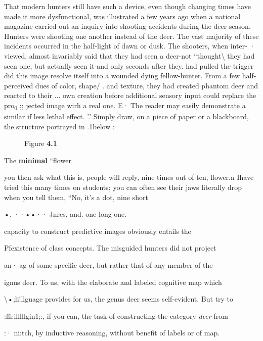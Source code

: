 That modern hunters still have such a device, even though changing times have made it more dysfunctional, was illustrated a few years ago when a national magazine carried out an inquiry into shooting accidents during the deer season. Hunters were shooting one another instead of the deer. The vast majority of these incidents oc\-curred in the half-light of dawn or dusk. The shooters, when inter- · viewed, almost invariably said that they had seen a deer-not ``thought{\textquotedbl}{\textbackslash} they had seen one, but actually seen it-and only seconds after they. had pulled the trigger did this image resolve itself into a wounded
dying fellow-hunter. From a few half-perceived dues of color, shape/ . and texture, they had created phantom deer and reacted to their ...
own creation before additional sensory input could replace the pro\textsubscript{0}\textsubscript{ };;
jected image wirh a real one. E·
The reader may easily demonstrate a similar if less lethal effect. '.'
Simply draw, on a piece of paper or a blackboard, the structure por\-trayed in .1below :

  


 
\begin{figure}
Figure \textbf{4.1}
\end{figure}

The \textbf{minimal} ``flower{\textquotedbl}


you then ask what this is, people will reply, nine times out of ten, flower.n Ihave tried this many times on students; you can often see their jaws literally drop when you tell them, ``No, it's a dot, nine short

•. ··••·· Jnres, and. one long one.{\textquotedbl}

capacity to construct predictive images obviously entails the

Pfexistence of class concepts. The misguided hunters did not project

an· ag of some specific deer, but rather that of any member of the

ignus deer. To us, with the elaborate and labeled cognitive map which

{\textbackslash}•;li!llguage provides for us, the genus deer seems self-evident. But try to

:ffi:illlllgin1;:, if you can, the task of constructing the category \textit{deer} from

:· ni:tch, by inductive reasoning, without benefit of labels or of map.

